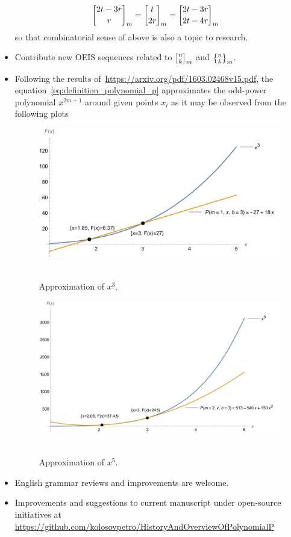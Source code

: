 \begin{itemize}
\begin{align*}
        {2t-3r \brack r}_{m} &= {t \brack 2r}_{m} = {2t-3r \brack 2t-4r}_{m}
    \end{align*}
    so that combinatorial sense of above is also a topic to research.
    \item Contribute new OEIS sequences related to ${n \brack k}_{m}$ and ${n \brace k}_{m}$.
    \item Following the results of~\url{https://arxiv.org/pdf/1603.02468v15.pdf},
    the equation~\eqref{eq:definition_polynomial_p} approximates the odd-power polynomial $x^{2m+1}$ around given points
    $x_i$ as it may be observed from the following plots
    \begin{figure}[H]
        \centering
        \includegraphics[width=1\textwidth]{images/n^3_approximation_m1_b3}
        ~\caption{Approximation of $x^3$.}\label{fig:approximation-n3}
    \end{figure}
    \begin{figure}[H]
        \centering
        \includegraphics[width=1\textwidth]{images/n^5_approximation_m2_b3}
        ~\caption{Approximation of $x^5$.}\label{fig:approximation-n5}
    \end{figure}
    \item English grammar reviews and improvements are welcome.
    \item Improvements and suggestions to current manuscript under open-source initiatives at
    \url{https://github.com/kolosovpetro/HistoryAndOverviewOfPolynomialP}
\end{itemize}
